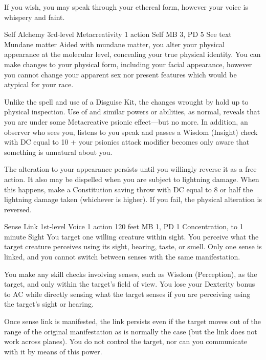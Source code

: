If you wish, you may speak through your ethereal form, however
your voice is whispery and faint.

\DndPowerHeader%
    {Self Alchemy\label{pwr:self_alchemy}}
    {3rd-level Metacreativity}
    {1 action}
    {Self}
    {MB 3, PD 5}
    {See text}
    {Mundane matter}
Aided with mundane matter, you alter your physical appearance
at the molecular level, concealing your true physical identity.
You can make changes to your physical form, including your facial
appearance, however you cannot change your apparent sex nor
present features which would be atypical for your race.

Unlike the  spell and use of a Disguise Kit,
the changes wrought by  hold up to
physical inspection. Use of 
and similar powers or abilities, as normal,
reveals that you are under some Metacreative psionic effect---but no more.
In addition, an observer who sees you, listens to you speak and passes
a Wisdom (Insight) check with DC equal to 10 + your psionics attack
modifier becomes only aware that something is unnatural about you.

The alteration to your appearance persists until you willingly
reverse it as a free action. It also may be dispelled when you are subject
to lightning damage. When this happens, make a Constitution saving
throw with DC equal to 8 or half the lightning damage taken
(whichever is higher). If you fail, the physical alteration is reversed.

\DndPowerHeader%
    {Sense Link\label{pwr:sense_link}}
    {1st-level Voice}
    {1 action}
    {120 feet}
    {MB 1, PD 1}
    {Concentration, to 1 minute}
    {Sight}
You target one willing creature within sight.
You perceive what the target creature perceives using its
sight, hearing, taste, or smell. Only one sense is linked,
and you cannot switch between senses with the same manifestation.

You make any skill checks involving senses, such as Wisdom
(Perception), as the target, and only within the target's
field of view. You lose your Dexterity bonus to AC while directly
sensing what the target senses if you are perceiving using
the target's sight or hearing.

Once sense link is manifested, the link persists even if the
target moves out of the range of the original manifestation
as is normally the case (but the link does not work across
planes). You do not control the target, nor can you communicate
with it by means of this power.


